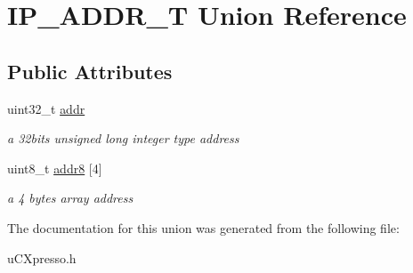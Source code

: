 \hypertarget{union_i_p___a_d_d_r___t}{\section{I\-P\-\_\-\-A\-D\-D\-R\-\_\-\-T Union Reference}
\label{union_i_p___a_d_d_r___t}
}
\subsection*{Public Attributes}
\begin{DoxyCompactItemize}
\item 
\hypertarget{union_i_p___a_d_d_r___t_a7d804478df76fbcabec9ea3e252b07d4}{uint32\-\_\-t \hyperlink{union_i_p___a_d_d_r___t_a7d804478df76fbcabec9ea3e252b07d4}{addr}}\label{union_i_p___a_d_d_r___t_a7d804478df76fbcabec9ea3e252b07d4}

\begin{DoxyCompactList}\small\item\em a 32bits unsigned long integer type address \end{DoxyCompactList}\item 
\hypertarget{union_i_p___a_d_d_r___t_a46438b841f54b90fdaa0ef824dbcc2c2}{uint8\-\_\-t \hyperlink{union_i_p___a_d_d_r___t_a46438b841f54b90fdaa0ef824dbcc2c2}{addr8} \mbox{[}4\mbox{]}}\label{union_i_p___a_d_d_r___t_a46438b841f54b90fdaa0ef824dbcc2c2}

\begin{DoxyCompactList}\small\item\em a 4 bytes array address \end{DoxyCompactList}\end{DoxyCompactItemize}


The documentation for this union was generated from the following file\-:\begin{DoxyCompactItemize}
\item 
u\-C\-Xpresso.\-h\end{DoxyCompactItemize}
